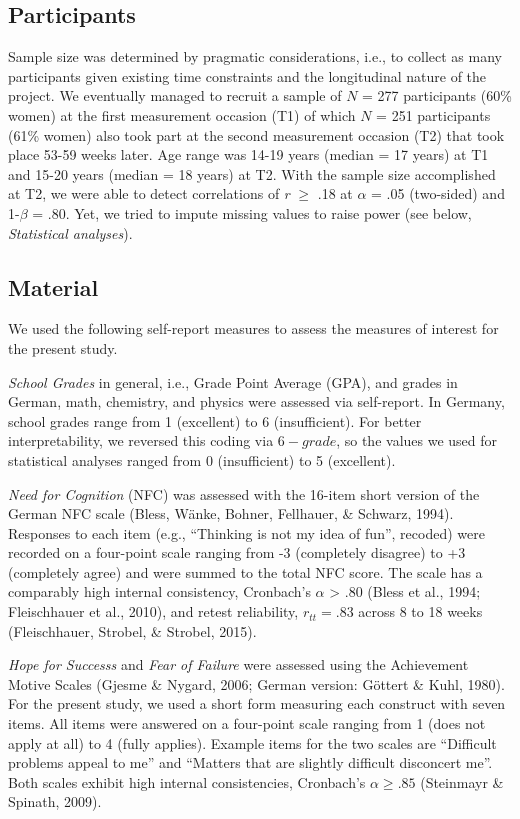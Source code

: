\documentclass[
  man]{apa6}
\begin{document}
\hypertarget{participants}{%
\subsection{Participants}\label{participants}}

Sample size was determined by pragmatic considerations, i.e., to collect as many participants given existing time constraints and the longitudinal nature of the project. We eventually managed to recruit a sample of \(N\) = 277 participants (60\% women) at the first measurement occasion (T1) of which \(N\) = 251 participants (61\% women) also took part at the second measurement occasion (T2) that took place 53-59 weeks later. Age range was 14-19 years (median = 17 years) at T1 and 15-20 years (median = 18 years) at T2. With the sample size accomplished at T2, we were able to detect correlations of \emph{r} \(\ge\) .18 at \(\alpha\) = .05 (two-sided) and 1-\(\beta\) = .80. Yet, we tried to impute missing values to raise power (see below, \emph{Statistical analyses}).

\hypertarget{material}{%
\subsection{Material}\label{material}}

We used the following self-report measures to assess the measures of interest for the present study.

\emph{School Grades} in general, i.e., Grade Point Average (GPA), and grades in German, math, chemistry, and physics were assessed via self-report. In Germany, school grades range from 1 (excellent) to 6 (insufficient). For better interpretability, we reversed this coding via \(6 - grade\), so the values we used for statistical analyses ranged from 0 (insufficient) to 5 (excellent).

\emph{Need for Cognition} (NFC) was assessed with the 16-item short version of the German NFC scale (Bless, Wänke, Bohner, Fellhauer, \& Schwarz, 1994). Responses to each item (e.g., ``Thinking is not my idea of fun'', recoded) were recorded on a four-point scale ranging from -3 (completely disagree) to +3 (completely agree) and were summed to the total NFC score. The scale has a comparably high internal consistency, Cronbach's \(\alpha\) \textgreater{} .80 (Bless et al., 1994; Fleischhauer et al., 2010), and retest reliability, \(r_{tt} = .83\) across 8 to 18 weeks (Fleischhauer, Strobel, \& Strobel, 2015).

\emph{Hope for Successs} and \emph{Fear of Failure} were assessed using the Achievement Motive Scales (Gjesme \& Nygard, 2006; German version: Göttert \& Kuhl, 1980). For the present study, we used a short form measuring each construct with seven items. All items were answered on a four-point scale ranging from 1 (does not apply at all) to 4 (fully applies). Example items for the two scales are ``Difficult problems appeal to me'' and ``Matters that are slightly difficult disconcert me''. Both scales exhibit high internal consistencies, Cronbach's \(\alpha\ge.85\) (Steinmayr \& Spinath, 2009).
\end{document}
